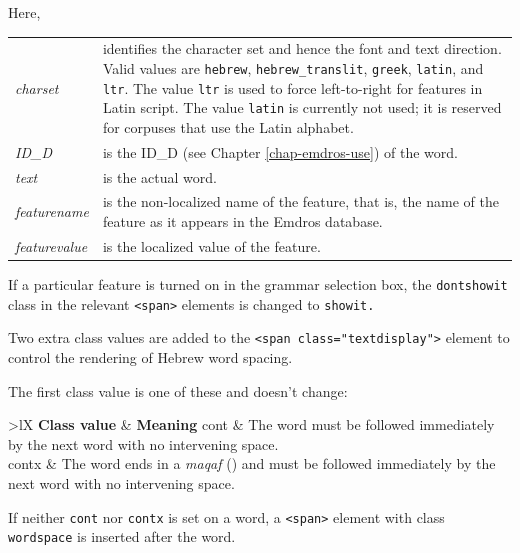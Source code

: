 \documentclass[11pt,oneside,a4paper]{memoir}
\makeatletter
\newcommand{\heb}[1]{{\RL {\ezr #1}}}
\newcommand*{\xml}[1]{\texttt{<#1>}}
\newcommand*{\xmla}[1]{\texttt{#1}} %
\newcommand{\headii}[2]{\textbf{#1} & \textbf{#2}}
\newenvironment{my-tabu}[2]{%
\begin{center}
\begin{tabu}{@{}#1@{}}
  \toprule
  #2\\\addlinespace[-1mm]
  \midrule
}{%
\addlinespace[-1mm]\bottomrule
\end{tabu}
\end{center}%
}
\makeatother
\begin{document}
\begin{minipage}{\textwidth}
Here,

\begin{tabu}{>{\itshape}lX}
charset & identifies the character set and hence the font and text direction. Valid values are
          \xmla{hebrew}, \xmla{hebrew\_translit}, \xmla{greek}, \xmla{latin}, and \xmla{ltr}. The
          value \xmla{ltr} is used to force left-to-right for features in Latin script. The value
          \xmla{latin} is currently not used; it is reserved for corpuses that use the Latin
          alphabet.\\

ID\_D & is the ID\_D (see Chapter \ref{chap-emdros-use}) of the word.\\

text & is the actual word.\\

featurename & is the non-localized name of the feature, that is, the name of the feature as it
appears in the Emdros database.\\

featurevalue & is the localized value of the feature.\\
\end{tabu}
\end{minipage}

If a particular feature is turned on in the grammar selection box, the
\xmla{dontshowit} class in the relevant \xml{span} elements is changed to \xmla{showit.}

Two extra class values are added to the \xml{span class="textdisplay"} element to control the
rendering of Hebrew word spacing.

The first class value is one of these and doesn't change:

\begin{my-tabu}{>{\ttfamily}lX}{ \headii{\textrm{Class value}}{Meaning} }
  cont & The word must be followed immediately by the next word with no intervening space.\\

  contx & The word ends in a \emph{maqaf} (\heb{־}) and must be followed immediately by the next word
  with no intervening space.\\
\end{my-tabu}

If neither \xmla{cont} nor \xmla{contx} is set on a word, a \xml{span} element with class
\xmla{wordspace} is inserted after the word.
\end{document}
